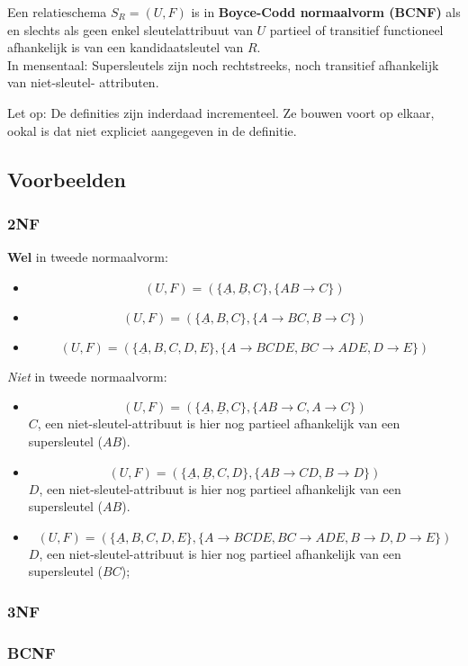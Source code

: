 \documentclass[normaalvormen.tex]{subfiles}
\begin{document}
\begin{de}
Een relatieschema $S_{R} = (U,F)$ is in \textbf{Boyce-Codd normaalvorm (BCNF)} als en slechts als geen enkel sleutelattribuut van $U$ partieel of transitief functioneel afhankelijk is van een kandidaatsleutel van $R$.\\
In mensentaal: Supersleutels zijn  noch rechtstreeks, noch transitief afhankelijk van niet-sleutel- attributen.
\end{de}

Let op: De definities zijn inderdaad incrementeel. Ze bouwen voort op elkaar, ookal is dat niet expliciet aangegeven in de definitie.

\subsection{Voorbeelden}
\subsubsection*{2NF}
\textbf{Wel} in tweede normaalvorm:
\begin{itemize}
\item
\[
(U,F) = (\{\underline{A}, \underline{B}, C\},\{AB\rightarrow C\})
\]
\item
\[
(U,F) = (\{\underline{A},B,C\},\{A\rightarrow BC, B\rightarrow C\})
\]
\item
\[
(U,F) = (\{\underline{A},B,C,D,E\},\{A\rightarrow BCDE, BC\rightarrow ADE, D\rightarrow E\})
\]
\end{itemize}
\textit{Niet} in tweede normaalvorm:
\begin{itemize}
\item
\[
(U,F) = (\{\underline{A}, \underline{B}, C\},\{AB\rightarrow C, A \rightarrow C\})
\]
$C$, een niet-sleutel-attribuut is hier nog partieel afhankelijk van een supersleutel ($AB$).
\item
\[
(U,F) = (\{\underline{A}, \underline{B}, C , D\},\{AB\rightarrow CD, B \rightarrow D\})
\]
$D$, een niet-sleutel-attribuut is hier nog partieel afhankelijk van een supersleutel ($AB$).
\item
\[
(U,F) = (\{\underline{A},B,C,D,E\},\{A\rightarrow BCDE, BC\rightarrow ADE, B\rightarrow D, D\rightarrow E\})
\]
$D$, een niet-sleutel-attribuut is hier nog partieel afhankelijk van een supersleutel ($BC$);
\end{itemize}


\subsubsection*{3NF}

\subsubsection*{BCNF}
\end{document}
